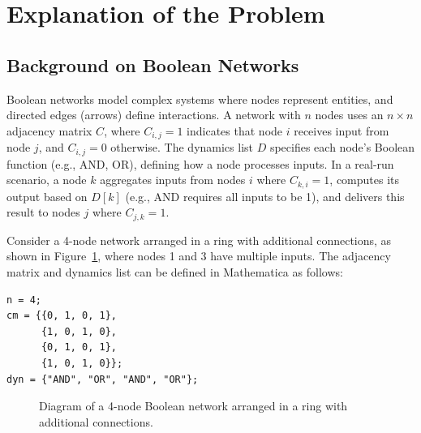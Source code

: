 \documentclass[12pt]{article}
\begin{document}
\section{Explanation of the Problem}
\subsection{Background on Boolean Networks}
Boolean networks model complex systems where nodes represent entities, and directed edges (arrows) define interactions. A network with \( n \) nodes uses an \( n \times n \) adjacency matrix \( C \), where \( C_{i,j} = 1 \) indicates that node \( i \) receives input from node \( j \), and \( C_{i,j} = 0 \) otherwise. The dynamics list \( D \) specifies each node’s Boolean function (e.g., AND, OR), defining how a node processes inputs. In a real-run scenario, a node \( k \) aggregates inputs from nodes \( i \) where \( C_{k,i} = 1 \), computes its output based on \( D[k] \) (e.g., AND requires all inputs to be 1), and delivers this result to nodes \( j \) where \( C_{j,k} = 1 \).

Consider a 4-node network arranged in a ring with additional connections, as shown in Figure~\ref{fig:network_diagram}, where nodes 1 and 3 have multiple inputs. The adjacency matrix and dynamics list can be defined in Mathematica as follows:
\begin{lstlisting}[caption={Mathematica Definition of 4-Node Network}]
n = 4;
cm = {{0, 1, 0, 1}, 
      {1, 0, 1, 0}, 
      {0, 1, 0, 1}, 
      {1, 0, 1, 0}};
dyn = {"AND", "OR", "AND", "OR"};
\end{lstlisting}
\begin{figure}[h]
    \centering
    \caption{Diagram of a 4-node Boolean network arranged in a ring with additional connections.}
    \label{fig:network_diagram}
\end{figure}
\end{document}
